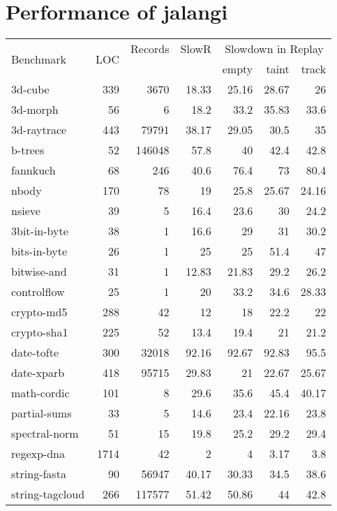 \documentclass{sig-alternate}
\begin{document}
\section{Performance of  jalangi}
\label{sec:performance-jalangi}

\begin{table}
{\scriptsize
\begin{center}
\begin{tabular}{|l|r|r|r|r|r|r|} \hline
\multirow{2}{*}{Benchmark} & \multirow{2}{*}{LOC} & \scriptsize{Records} & \scriptsize{SlowR} &
\multicolumn{3}{|c|}{\scriptsize{ Slowdown in Replay}}\\
& & & & empty & taint & track \\
\hline
3d-cube & 339 & 3670 & 18.33  & 25.16 & 28.67 & 26 \\
3d-morph& 56 & 6 & 18.2 & 33.2 & 35.83 & 33.6 \\
3d-raytrace& 443 & 79791 & 38.17 & 29.05 & 30.5 & 35\\
b-trees& 52 & 146048 & 57.8 & 40 & 42.4 & 42.8\\
fannkuch& 68 & 246 & 40.6 & 76.4 & 73 & 80.4 \\
nbody& 170 & 78 & 19 & 25.8& 25.67 & 24.16\\
nsieve& 39 & 5 & 16.4 & 23.6 & 30 & 24.2\\
3bit-in-byte& 38 & 1 & 16.6& 29 & 31 & 30.2 \\
bits-in-byte& 26 & 1 & 25 & 25 & 51.4 & 47 \\
bitwise-and& 31 & 1 & 12.83 & 21.83 & 29.2 & 26.2\\
controlflow& 25 & 1 & 20 & 33.2 & 34.6 & 28.33\\
crypto-md5& 288 & 42 & 12 & 18 & 22.2 & 22\\
crypto-sha1& 225 & 52 & 13.4& 19.4 & 21 & 21.2\\
date-tofte& 300 & 32018 & 92.16 & 92.67 & 92.83 & 95.5\\
date-xparb& 418 & 95715 & 29.83 & 21 & 22.67 & 25.67\\
math-cordic& 101 & 8 & 29.6 & 35.6 & 45.4 & 40.17\\
partial-sums& 33 & 5 & 14.6 & 23.4 & 22.16& 23.8\\
spectral-norm& 51 & 15 & 19.8& 25.2 & 29.2 & 29.4\\
regexp-dna& 1714 & 42 &2 & 4 & 3.17 & 3.8\\
string-fasta& 90 & 56947 & 40.17 & 30.33 & 34.5 & 38.6\\
string-tagcloud& 266 & 117577 & 51.42 & 50.86 & 44 & 42.8\\

\end{tabular}
\end{center}}
\end{table}
\end{document}

